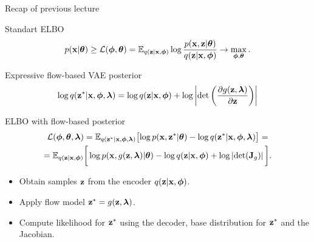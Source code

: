 \begin{frame}{Recap of previous lecture}
	\begin{block}{Standart ELBO}
		\vspace{-0.3cm}
		\[
			p(\mathbf{x} | \boldsymbol{\theta}) \geq \mathcal{L} (\boldsymbol{\phi}, \boldsymbol{\theta})  = \mathbb{E}_{q(\mathbf{z} | \mathbf{x}, \boldsymbol{\phi})} \log \frac{p(\mathbf{x}, \mathbf{z} | \boldsymbol{\theta})}{q(\mathbf{z}| \mathbf{x}, \boldsymbol{\phi})} \rightarrow \max_{\boldsymbol{\phi}, \boldsymbol{\theta}}.
		\]
		\vspace{-0.5cm}
	\end{block}
	\begin{block}{Expressive flow-based VAE posterior}
		\vspace{-0.3cm}
		\[
			\log q(\mathbf{z}^* | \mathbf{x}, \boldsymbol{\phi}, \boldsymbol{\lambda}) = \log q(\mathbf{z} | \mathbf{x}, \boldsymbol{\phi}) + \log \left| \det \left( \frac{\partial g(\mathbf{z}, \boldsymbol{\lambda})}{\partial \mathbf{z}} \right) \right|
		\]
		\vspace{-0.3cm}
	\end{block}
	\begin{block}{ELBO with flow-based posterior}
		\vspace{-0.8cm}
		\begin{multline*}
				\mathcal{L} (\boldsymbol{\phi}, \boldsymbol{\theta}, \boldsymbol{\lambda})  
				= \mathbb{E}_{q(\mathbf{z}^* | \mathbf{x}, \boldsymbol{\phi}, \boldsymbol{\lambda})} \bigl[\log p(\mathbf{x}, \mathbf{z}^* | \boldsymbol{\theta}) - \log q(\mathbf{z}^*| \mathbf{x}, \boldsymbol{\phi}, \boldsymbol{\lambda}) \bigr] = \\
				= \mathbb{E}_{q(\mathbf{z} | \mathbf{x}, \boldsymbol{\phi})} \bigg[\log p(\mathbf{x}, g(\mathbf{z}, \boldsymbol{\lambda}) | \boldsymbol{\theta}) -  \log q(\mathbf{z} | \mathbf{x}, \boldsymbol{\phi} ) + \log \left| \det (\mathbf{J}_g) \right| \bigg].
		\end{multline*}
		\vspace{-0.6cm}
	\end{block}
	\begin{itemize}
		\item Obtain samples $\mathbf{z}$ from the encoder $q(\mathbf{z} | \mathbf{x}, \boldsymbol{\phi})$.
		\item Apply flow model $\mathbf{z}^* = g(\mathbf{z}, \boldsymbol{\lambda})$.
		\item Compute likelihood for $\mathbf{z}^*$ using the decoder, base distribution for $\mathbf{z}^*$ and the Jacobian.
	\end{itemize}
\end{frame}
